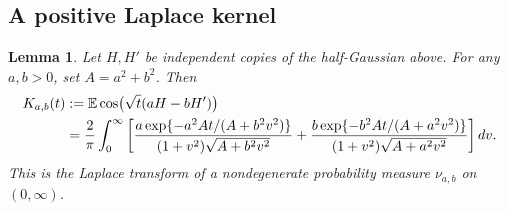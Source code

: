 \documentclass[11pt]{article}
\newtheorem{lemma}[theorem]{Lemma}
\newcommand{\E}{\mathbb E}
\begin{document}
\subsection*{A positive Laplace kernel}
\begin{lemma}\label{lem:kernel}
Let $H,H'$ be independent copies of the half-Gaussian above. For any
$a,b>0$, set $A=a^2+b^2$. Then
\begin{align}
 K_{a,b}(t)&:=\E\cos\bigl(\sqrt t(aH-bH')\bigr)\notag\\
 &=\frac2\pi\int_0^\infty\left[
 \frac{a\exp\{-a^2At/(A+b^2v^2)\}}
 {(1+v^2)\sqrt{A+b^2v^2}}
 +\frac{b\exp\{-b^2At/(A+a^2v^2)\}}
 {(1+v^2)\sqrt{A+a^2v^2}}\right]dv.\label{eq:kernel}
\end{align}
This is the Laplace transform of a nondegenerate probability measure
$\nu_{a,b}$ on $(0,\infty)$.
\end{lemma}
\end{document}
